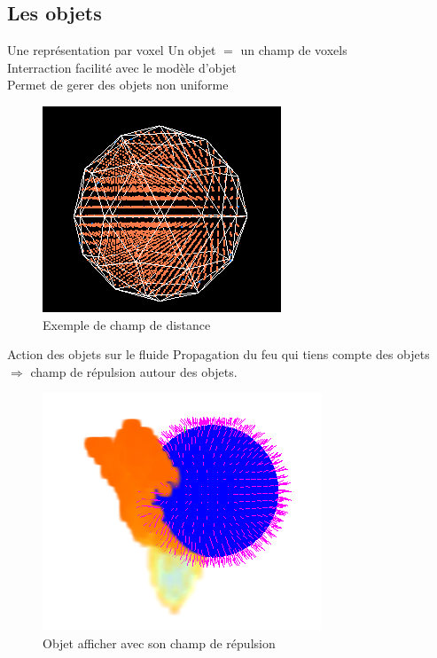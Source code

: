 \documentclass{beamer}
\begin{document}
\subsection{Les objets}
\begin{frame}{Une représentation par voxel}
  Un objet $=$ un champ de voxels\\
  Interraction facilité avec le modèle d'objet\\
  Permet de gerer des objets non uniforme\\
  \begin{figure}[!h]
    \centering\includegraphics[scale=0.4]{Distance.png}
    \caption{Exemple de champ de distance}
    \label{Distance}
  \end{figure}
\end{frame}

\begin{frame}{Action des objets sur le fluide}
  Propagation du feu qui tiens compte des objets\\
  $\Rightarrow$ champ de répulsion autour des objets.
  \begin{figure}[!h]
    \centering\includegraphics[scale=0.4]{Contour.png}
    \caption{Objet afficher avec son champ de répulsion}
    \label{repulsion}
  \end{figure}
\end{frame}
\end{document}
